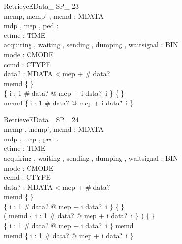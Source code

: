 \begin{schema}{RetrieveEData\_ SP\_ 23}\\
 memp, memp' , memd : \seq MDATA \\
 mdp , mep , ped : \nat \\
 ctime : TIME \\
 acquiring , waiting , sending , dumping , waitsignal : BIN \\
 mode : CMODE \\
 ccmd : CTYPE \\
 data? : \seq MDATA 
 < mep + \# data? \\
 memd \neq \{ \} \\
 \{ i : 1 \upto \# data? @ mep + i \mapsto data?~i \} \neq \{ \} \\
 \dom memd \subset \dom \{ i : 1 \upto \# data? @ mep + i \mapsto data?~i \}
\end{schema}


\begin{schema}{RetrieveEData\_ SP\_ 24}\\
 memp , memp', memd : \seq MDATA \\
 mdp , mep , ped : \nat \\
 ctime : TIME \\
 acquiring , waiting , sending , dumping , waitsignal : BIN \\
 mode : CMODE \\
 ccmd : CTYPE \\
 data? : \seq MDATA 
 < mep + \# data? \\
 memd \neq \{ \} \\
 \{ i : 1 \upto \# data? @ mep + i \mapsto data?~i \} \neq \{ \} \\
 ( \dom memd \cap \dom \{ i : 1 \upto \# data? @ mep + i \mapsto data?~i \} ) \neq \{ \} \\
 \lnot \dom \{ i : 1 \upto \# data? @ mep + i \mapsto data?~i \} \subseteq \dom memd \\
 \lnot \dom memd \subseteq \dom \{ i : 1 \upto \# data? @ mep + i \mapsto data?~i \}
\end{schema}

